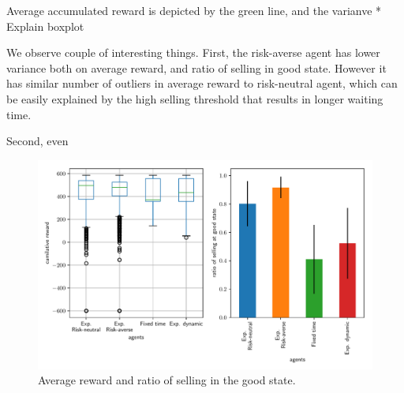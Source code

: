 Average accumulated reward is depicted by the green line, and the varianve
* Explain boxplot

We observe couple of interesting things.
First, the risk-averse agent has lower variance both on average reward, and ratio of selling in good state. However it has similar number of outliers in average reward to risk-neutral agent, which can be easily explained by the high selling threshold that results in longer waiting time.

Second, even 

\begin{figure}[h]
    \centering
    \includegraphics[width=0.99\linewidth]{img/performance.pdf}
    \caption{Average reward and ratio of selling in the good state.}\label{fig:perf}
\end{figure}

